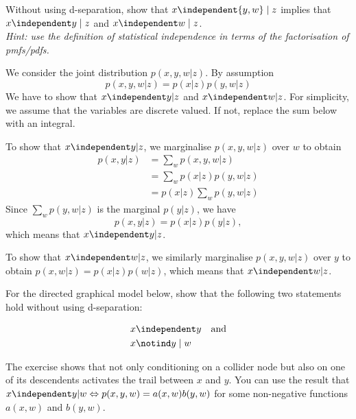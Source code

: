 \begin{exenumerate}
\item Without using d-separation, show that $x \independent \{y,w\} \mid z$ implies that $x \independent y \mid z$ and $x \independent w \mid z$.\\
\emph{Hint: use the definition of statistical independence in terms of the factorisation of pmfs/pdfs.}
  
  \begin{loesung}
    We consider the joint distribution $p(x,y,w | z)$. By assumption
    \begin{equation}
      p(x,y,w | z) = p(x |z) p(y,w | z)
    \end{equation}
    We have to show that $x \independent y| z$ and $x \independent w | z$. For simplicity, we assume that the variables are discrete valued. If not, replace the sum below with an integral.

    To show that $x \independent y| z$, we marginalise $p(x,y,w | z)$
    over $w$ to obtain
    \begin{align}
      p(x,y | z ) & = \sum_w p(x,y,w | z) \\
      & = \sum_w  p(x |z) p(y,w | z) \\
      & = p(x | z) \sum_w p(y,w | z)
    \end{align}
    Since $\sum_w p(y,w | z)$ is the marginal $p(y |z)$, we have
    \begin{equation}
       p(x,y | z ) =  p(x | z) p(y | z),
    \end{equation}
    which means that $x \independent y | z$.

    To show that $x \independent w| z$, we similarly marginalise
    $p(x,y,w | z)$ over $y$ to obtain $p(x,w | z) =
    p(x|z) p(w |z)$, which means that $x \independent w | z$.
    
  \end{loesung}


\item For the directed graphical model below, show that the following two statements hold without using d-separation:

  \begin{align}
  &x \independent y \quad \text{and} \label{eq:statement1} \\
  &x \notind y \mid w \label{eq:statement2}
  \end{align}

  \begin{center}
  \end{center}
  The exercise shows that not only conditioning on a collider node but also on one of its descendents activates the trail between $x$ and $y$. You can use the result that $x \independent y |w \Leftrightarrow p(x,y,w) = a(x,w)b(y,w)$ for some non-negative functions $a(x,w)$ and $b(y,w)$.
  

\end{exenumerate}
